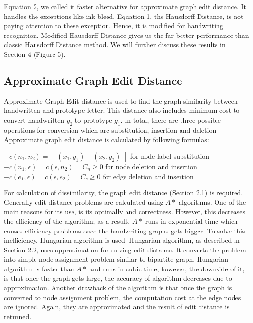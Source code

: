 \documentclass{article}
\begin{document}
Equation 2, we called it faster alternative for approximate graph edit distance. It handles the exceptions like ink bleed. Equation 1, the Hausdorff Distance, is not paying attention to these exception. Hence, it is modified for handwriting recognition. Modified Hausdorff Distance gives us the far better performance than classic Hausdorff Distance method. We will further discuss these results in Section 4 (Figure 5).

 
\subsection{Approximate Graph Edit Distance}

Approximate Graph Edit distance is used to find the graph similarity between handwritten and prototype letter. This distance also includes minimum cost to convert handwritten $g_2$ to prototype $g_1$. In total, there are three possible operations for conversion which are substitution, insertion and deletion. Approximate graph edit distance is calculated by following formulas:


\begin{center}
$-c\left(n_{1}, n_{2}\right)=\left\|\left(x_{1}, y_{1}\right)-\left(x_{2}, y_{2}\right)\right\|$ for node label substitution\\ 

$-c\left(n_{1}, \epsilon\right)=c\left(\epsilon, n_{2}\right)=C_{n} \geq 0 $ for node deletion and insertion\\ 

$-c\left(e_{1}, \epsilon\right)=c\left(\epsilon, e_{2}\right)=C_{e} \geq 0 $  for edge deletion and insertion\\
\end{center}


For calculation of dissimilarity, the graph edit distance (Section 2.1) is required. Generally edit distance problems are calculated using $A*$ algorithms. One of the main reasons for its use, is its optimally and correctness. However, this decreases the efficiency of the algorithm; as a result,  $A*$ runs in exponential time which causes efficiency problems once the handwriting graphs gets bigger. To solve this inefficiency, Hungarian algorithm is used. 
Hungarian algorithm, as described in Section 2.2, uses approximation for solving edit distance. It converts the problem into simple node assignment problem similar to bipartite graph. Hungarian algorithm is faster than $A*$ and runs in cubic time, however, the downside of it, is that once the graph gets large, the accuracy of algorithm decreases due to approximation. Another drawback of the algorithm is that once the graph is converted to node assignment problem, the computation cost at the edge nodes are ignored. Again, they are approximated and the result of edit distance is \\ returned. 
\end{document}
